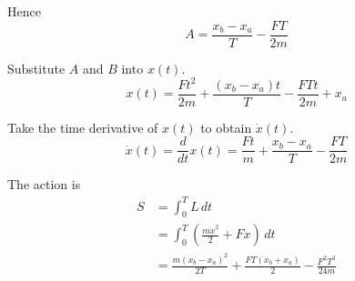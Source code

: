 Hence
\begin{equation*}
A=\frac{x_b-x_a}{T}-\frac{FT}{2m}
\end{equation*}

Substitute $A$ and $B$ into $x(t)$.
\begin{equation*}
x(t)=\frac{Ft^2}{2m}+\frac{(x_b-x_a)t}{T}-\frac{FTt}{2m}+x_a
\tag{1}
\end{equation*}

Take the time derivative of $x(t)$ to obtain $\dot x(t)$.
\begin{equation*}
\dot x(t)=\frac{d}{dt}x(t)=\frac{Ft}{m}+\frac{x_b-x_a}{T}-\frac{FT}{2m}
\tag{2}
\end{equation*}

The action is
\begin{align*}
S&=\int_0^TL\,dt
\\
&=\int_0^T\left(\frac{m\dot x^2}{2}+Fx\right)\,dt
\\
&=\frac{m(x_b-x_a)^2}{2T}+\frac{FT(x_b+x_a)}{2}-\frac{F^2T^3}{24m}
\tag{3}
\end{align*}


